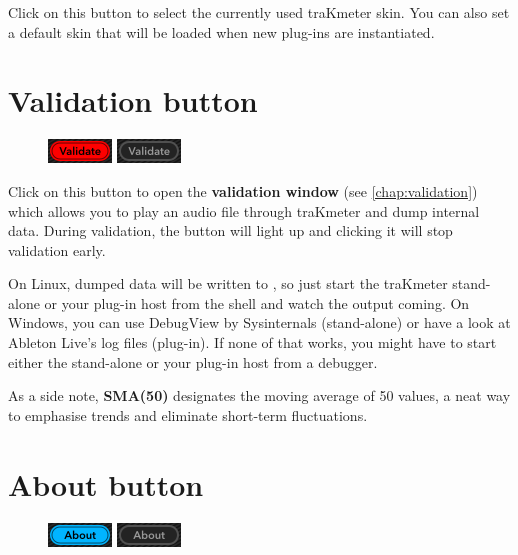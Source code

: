 Click on this button to select the currently used traKmeter skin.  You
can also set a default skin that will be loaded when new plug-ins are
instantiated.

\section{Validation button}
\label{sec:validation_button}

\begin{figure}
\includegraphics[scale=\screenshotscale,clip]{include/images/button_validate_on.png}
\newline \vspace{-0.9\baselineskip}
\includegraphics[scale=\screenshotscale,clip]{include/images/button_validate_off.png}
\end{figure}

Click on this button to open the \textbf{validation window} (see
\ref{chap:validation}) which allows you to play an audio file through
traKmeter and dump internal data.  During validation, the button will
light up and clicking it will stop validation early.

On Linux, dumped data will be written to , so just start
the traKmeter stand-alone or your plug-in host from the shell and
watch the output coming.  On Windows, you can use DebugView by
Sysinternals (stand-alone) or have a look at Ableton Live's log files
(plug-in).  If none of that works, you might have to start either the
stand-alone or your plug-in host from a debugger.

As a side note, \textbf{SMA(50)} designates the moving average of 50
values, a neat way to emphasise trends and eliminate short-term
fluctuations.

\section{About button}

\begin{figure}
\includegraphics[scale=\screenshotscale,clip]{include/images/button_about_on.png}
\newline \vspace{-0.9\baselineskip}
\includegraphics[scale=\screenshotscale,clip]{include/images/button_about_off.png}
\end{figure}

